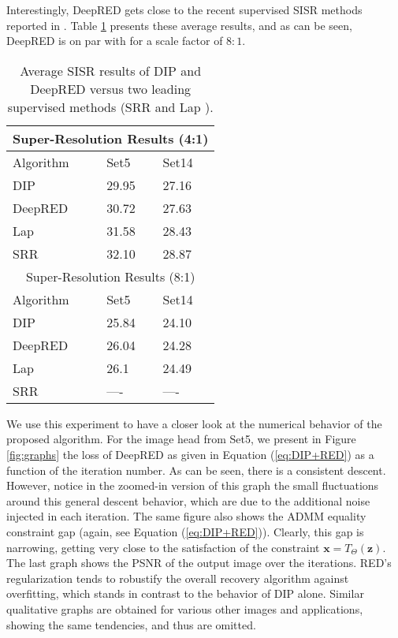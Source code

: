 \documentclass[12pt]{article}
\def\x{{\mathbf x}}
\def\z{{\mathbf z}}
\begin{document}
Interestingly, DeepRED gets close to the recent supervised SISR methods reported in \cite{LapSRN,SRresnet}. Table \ref{Tab:Supervised} presents these average results, and as can be seen, DeepRED is on par with \cite{LapSRN} for a scale factor of $8:1$. 

\begin{table}[htbp]
\centering
 \footnotesize\addtolength{\tabcolsep}{-5pt}
\begin{tabularx}{\linewidth}{|X||X X|}
\hline
 \multicolumn{3}{|c|}{Super-Resolution Results (4:1)} \\
 \hline
 Algorithm & \textsf{Set5} & \textsf{Set14} \\ [0.1ex] 
 \hline
DIP & 29.95 & 27.16 \\
DeepRED & 30.72 & 27.63 \\
Lap & 31.58 & 28.43 \\
SRR & 32.10 & 28.87 \\
\hline
 \multicolumn{3}{|c|}{Super-Resolution Results (8:1)} \\
 \hline
 Algorithm & \textsf{Set5} & \textsf{Set14} \\ [0.1ex] 
 \hline
DIP & 25.84 & 24.10 \\
DeepRED & 26.04 & 24.28 \\
Lap & 26.1 & 24.49 \\
SRR & ---- & ---- \\
 \hline
\end{tabularx}
\caption{Average SISR results of DIP and DeepRED versus two leading supervised methods (SRR \cite{SRresnet} and Lap \cite{LapSRN}).}
\label{Tab:Supervised}
\end{table}



We use this experiment to have a closer look at the numerical behavior of the proposed algorithm. For the image \textsf{head} from \textsf{Set5}, we present in Figure \ref{fig:graphs} the loss of DeepRED as given in Equation (\ref{eq:DIP+RED}) as a function of the iteration number. As can be seen, there is a consistent descent. However, notice in the zoomed-in version of this graph the small fluctuations around this general descent behavior, which are due to the additional noise injected in each iteration. The same figure also shows the ADMM equality constraint gap (again, see Equation (\ref{eq:DIP+RED})). Clearly, this gap is narrowing, getting very close to the satisfaction of the constraint $\x = T_{\Theta} (\z)$. The last graph shows the PSNR of the output image over the iterations. RED's regularization tends to robustify the overall recovery algorithm against overfitting, which stands in contrast to the behavior of DIP alone. Similar qualitative graphs are obtained for various other images and applications, showing the same tendencies, and thus are omitted. 
\end{document}
